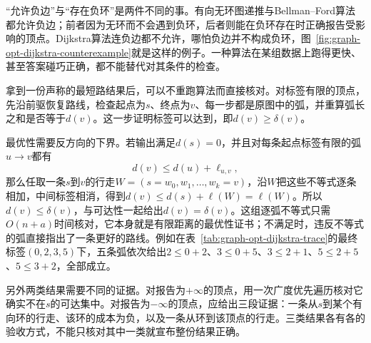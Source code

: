 “允许负边”与“存在负环”是两件不同的事。有向无环图递推与Bellman--Ford算法都允许负边；前者因为无环而不会遇到负环，后者则能在负环存在时正确报告受影响的顶点。Dijkstra算法连负边都不允许，哪怕负边并不构成负环，图~\ref{fig:graph-opt-dijkstra-counterexample}就是这样的例子。一种算法在某组数据上跑得更快、甚至答案碰巧正确，都不能替代对其条件的检查。

拿到一份声称的最短路结果后，可以不重跑算法而直接核对。对标签有限的顶点，先沿前驱恢复路线，检查起点为$s$、终点为$v$、每一步都是原图中的弧，并重算弧长之和是否等于$d(v)$。这一步证明标签可以达到，即$d(v)\geq\delta(v)$。

最优性需要反方向的下界。若输出满足$d(s)=0$，并且对每条起点标签有限的弧$u\to v$都有
\[
  d(v)\leq d(u)+\ell_{u,v},
\]
那么任取一条$s$到$v$的行走$W=(s=w_0,w_1,\ldots,w_k=v)$，沿$W$把这些不等式逐条相加，中间标签相消，得到$d(v)\leq d(s)+\ell(W)=\ell(W)$。所以$d(v)\leq\delta(v)$，与可达性一起给出$d(v)=\delta(v)$。这组逐弧不等式只需$O(n+a)$时间核对，它本身就是有限距离的最优性证书；不满足时，违反不等式的弧直接指出了一条更好的路线。例如在表~\ref{tab:graph-opt-dijkstra-trace}的最终标签$(0,2,3,5)$下，五条弧依次给出$2\leq0+2$、$3\leq0+5$、$3\leq2+1$、$5\leq2+5$、$5\leq3+2$，全部成立。

另外两类结果需要不同的证据。对报告为$+\infty$的顶点，用一次广度优先遍历核对它确实不在$s$的可达集中。对报告为$-\infty$的顶点，应给出三段证据：一条从$s$到某个有向环的行走、该环的成本为负，以及一条从环到该顶点的行走。三类结果各有各的验收方式，不能只核对其中一类就宣布整份结果正确。
